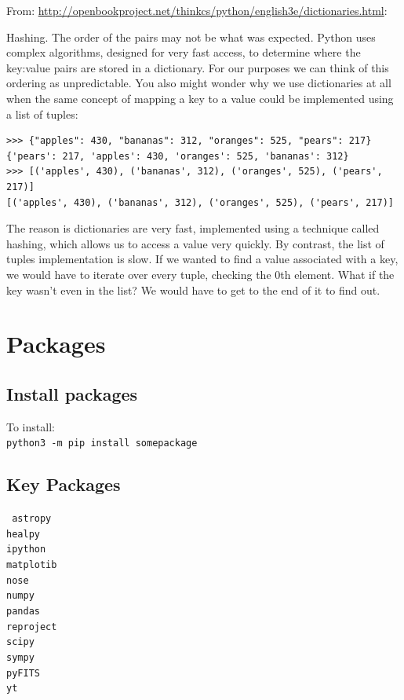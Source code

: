 \documentclass[11pt,a4paper]{article}
\begin{document}
\noindent
From: \href{http://openbookproject.net/thinkcs/python/english3e/dictionaries.html}{http://openbookproject.net/thinkcs/python/english3e/dictionaries.html}:

Hashing. The order of the pairs may not be what was expected. Python uses complex algorithms, designed for very fast access, to determine where the key:value pairs are stored in a dictionary. For our purposes we can think of this ordering as unpredictable.
You also might wonder why we use dictionaries at all when the same concept of mapping a key to a value could be implemented using a list of tuples:
\begin{lstlisting}
>>> {"apples": 430, "bananas": 312, "oranges": 525, "pears": 217}
{'pears': 217, 'apples': 430, 'oranges': 525, 'bananas': 312}
>>> [('apples', 430), ('bananas', 312), ('oranges', 525), ('pears', 217)]
[('apples', 430), ('bananas', 312), ('oranges', 525), ('pears', 217)]
\end{lstlisting}

The reason is dictionaries are very fast, implemented using a
technique called hashing, which allows us to access a value very
quickly. By contrast, the list of tuples implementation is slow. If we
wanted to find a value associated with a key, we would have to iterate
over every tuple, checking the 0th element. What if the key wasn’t
even in the list? We would have to get to the end of it to find out.


\newpage
\section{Packages}

\subsection{Install packages}

\noindent
To install: \\
{\tt python3 -m pip install somepackage}


\subsection{Key Packages}
{\tt
astropy \\
healpy\\
ipython \\ 
matplotib\\
nose \\
numpy\\
pandas \\
reproject\\
scipy \\
sympy \\ 
pyFITS\\
yt\\
}
\end{document}
